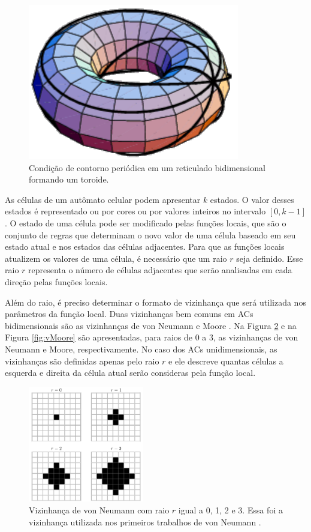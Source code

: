 \documentclass[12pt,a4paper]{article}
\begin{document}
	\begin{figure}[h!]
	  \centering
  	  \includegraphics{fig_toro.pdf}
	  \caption{Condição de contorno periódica em um reticulado bidimensional formando um toroide.}
	  \label{fig:toro}
	\end{figure}


As células de um autômato celular podem apresentar $k$ estados. O valor desses estados é representado ou por cores ou por valores inteiros no intervalo $[0, k-1]$. O estado de uma célula pode ser modificado pelas funções locais, que são o conjunto de regras que determinam o novo valor de uma célula baseado em seu estado atual e nos estados das células adjacentes. Para que as funções locais atualizem os valores de uma célula, é necessário que um raio $r$ seja definido. Esse raio $r$ representa o número de células adjacentes que serão analisadas em cada direção pelas funções locais.

Além do raio, é preciso determinar o formato de vizinhança que será utilizada nos parâmetros da função local. Duas vizinhanças bem comuns em ACs bidimensionais são as vizinhanças de von Neumann \cite{weisstein2015b} e Moore \cite{weisstein2015c}. Na Figura \ref{fig:vVonNeumann} e na Figura \ref{fig:vMoore} são apresentadas, para raios de 0 a 3, as vizinhanças de von Neumann e Moore, respectivamente. No caso dos ACs unidimensionais, as vizinhanças são definidas apenas pelo raio $r$ e ele descreve quantas células a esquerda e direita da célula atual serão consideras pela função local.

	\begin{figure}[h!]
	  \centering
	  \includegraphics[width=0.45\textwidth]{fig_vVonNeumann.pdf}
	  \caption{Vizinhança de von Neumann com raio $r$ igual a 0, 1, 2 e 3. Essa foi a vizinhança utilizada nos primeiros trabalhos de von Neumann \cite{weisstein2015b}.}
	  \label{fig:vVonNeumann}
	\end{figure}
\end{document}
